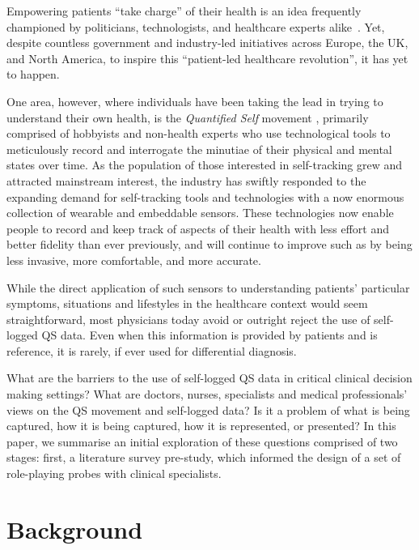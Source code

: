 \documentclass{sigchi}
\begin{document}
Empowering patients ``take charge'' of their health is an idea frequently championed by politicians, technologists, and healthcare experts alike~\cite{swan2012health}.  Yet, despite countless government and industry-led initiatives across Europe, the UK, and North America, to inspire this ``patient-led healthcare revolution'', it has yet to happen.  

One area, however, where individuals have been taking the lead in trying to understand their own health, is the \emph{Quantified Self} movement \cite{}, primarily comprised of hobbyists and non-health experts who use technological tools to meticulously record and interrogate the minutiae of their physical and mental states over time.   As the population of those interested in self-tracking grew and attracted mainstream interest, the industry has swiftly responded to the expanding demand for self-tracking tools and technologies with a now enormous collection of wearable and embeddable sensors.  These technologies now enable people to record and keep track of aspects of their health with less effort and better fidelity than ever previously, and will continue to improve such as by being less invasive, more comfortable, and more accurate.

While the direct application of such sensors to understanding patients' particular symptoms, situations and lifestyles in the healthcare context would seem straightforward, most physicians today avoid or outright reject the use of self-logged QS data. Even when this information is provided by patients and is reference, it is rarely, if ever used for differential diagnosis.  

What are the barriers to the use of self-logged QS data in critical clinical decision making settings?  What are doctors, nurses, specialists and medical professionals' views on the QS movement and self-logged data?  Is it a problem of what is being captured, how it is being captured, how it is represented, or presented?  In this paper, we summarise an initial exploration of these questions comprised of two stages: first, a literature survey pre-study, which informed the design of a set of role-playing probes with clinical specialists.

\section{Background} 

\end{document}
